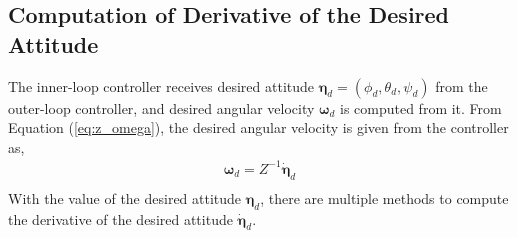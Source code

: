 \subsection{Computation of Derivative of the Desired Attitude}
\label{subsec:desired_attitude}
The inner-loop controller receives desired attitude \( {\boldsymbol \eta}_d = (\phi_d, \theta_d, \psi_d) \) from the outer-loop controller, and desired angular velocity \({\boldsymbol \omega}_d\) is computed from it. From Equation (\ref{eq:z_omega}), the desired angular velocity is given from the controller as, \\
\begin{equation}
\begin{aligned}
{\boldsymbol \omega}_d = Z^{-1}{\dot {\boldsymbol \eta}_d} \\
\end{aligned}
\end{equation}
With the value of the desired attitude \( {\boldsymbol \eta}_d  \), there are multiple methods to compute the derivative of the desired attitude \({\dot {\boldsymbol \eta}_d}\).

